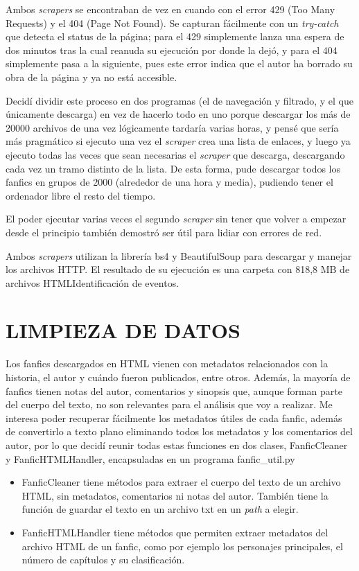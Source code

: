 \documentclass{pre-tfg}
\begin{document}
Ambos \textit{scrapers} se encontraban de vez en cuando con el error 429 (Too Many Requests) y el 404 (Page Not Found). Se capturan fácilmente con un \textit{try-catch} que detecta el status de la página; para el 429 simplemente lanza una espera de dos minutos tras la cual reanuda su ejecución por donde la dejó, y para el 404 simplemente pasa a la siguiente, pues este error indica que el autor ha borrado su obra de la página y ya no está accesible.
 
Decidí dividir este proceso en dos programas (el de navegación y filtrado, y el que únicamente descarga) en vez de hacerlo todo en uno porque descargar los más de 20000 archivos de una vez lógicamente tardaría varias horas, y pensé que sería más pragmático si ejecuto una vez el \textit{scraper} crea una lista de enlaces, y luego ya ejecuto todas las veces que sean necesarias el \textit{scraper} que descarga, descargando cada vez un tramo distinto de la lista. De esta forma, pude descargar todos los fanfics en grupos de 2000 (alrededor de una hora y media), pudiendo tener el ordenador libre el resto del tiempo.

El poder ejecutar varias veces el segundo \textit{scraper} sin tener que volver a empezar desde el principio también demostró ser útil para lidiar con errores de red.

Ambos \textit{scrapers} utilizan la librería bs4 y BeautifulSoup para descargar y manejar los archivos HTTP. El resultado de su ejecución es una carpeta con 818,8 MB de archivos HTMLIdentificación de eventos.

\section{LIMPIEZA DE DATOS}
\label{sec:limpiezadatos}
Los fanfics descargados en HTML vienen con metadatos relacionados con la historia, el autor y cuándo fueron publicados, entre otros. Además, la mayoría de fanfics tienen notas del autor, comentarios y sinopsis que, aunque forman parte del cuerpo del texto, no son relevantes para el análisis que voy a realizar.
Me interesa poder recuperar fácilmente los metadatos útiles de cada fanfic, además de convertirlo a texto plano eliminando todos los metadatos y los comentarios del autor, por lo que decidí reunir todas estas funciones en dos clases, FanficCleaner y FanficHTMLHandler, encapsuladas en un programa fanfic\_util.py

\begin{itemize}
	\item FanficCleaner tiene métodos para extraer el cuerpo del texto de un archivo HTML, sin metadatos, comentarios ni notas del autor. También tiene la función de guardar el texto en un archivo txt en un \textit{path} a elegir.
	\item FanficHTMLHandler tiene métodos que permiten extraer metadatos del archivo HTML de un fanfic, como por ejemplo los personajes principales, el número de capítulos y su clasificación.
\end{itemize}
\end{document}
